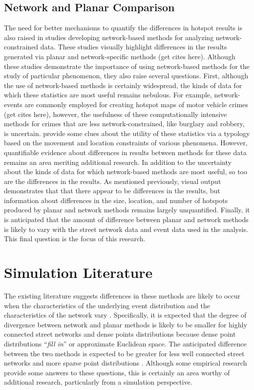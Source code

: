 \documentclass[12pt, letterpaper]{article}
\begin{document}
\subsection{Network and Planar Comparison}
The need for better mechanisms to quantify the differences in hotspot results is also raised in studies developing network-based methods for analyzing network-constrained data. These studies visually highlight differences in the results generated via planar and network-specific methods (get cites here). Although these studies demonstrate the importance of using network-based methods for the study of particular phenomenon, they also raise several questions. First, although the use of network-based methods is certainly widespread, the kinds of data for which these statistics are most useful remains nebulous. For example, network-events are commonly employed for creating hotspot maps of motor vehicle crimes (get cites here), however, the usefulness of these computationally intensive methods for crimes that are less network-constrained, like burglary and robbery, is uncertain. \citet{yamada2007local} provide some clues about the utility of these statistics via a typology based on the movement and location constraints of various phenomena. However, quantifiable evidence about differences in results between methods for these data remains an area meriting additional research. In addition to the uncertainty about the kinds of data for which network-based methods are most useful, so too are the differences in the results. As mentioned previously, visual output demonstrates that that there appear to be differences in the results, but information about differences in the size, location, and number of hotspots produced by planar and network methods remains largely unquantified. Finally, it is anticipated that the amount of difference between planar and network methods is likely to vary with the street network data and event data used in the analysis. This final question is the focus of this research.

\section{Simulation Literature}
The existing literature suggests differences in these methods are likely to occur when the characteristics of the underlying event distribution and the characteristics of the network vary \citep{yamada2004comparison}. Specifically, it is expected that the degree of divergence between network and planar methods is likely to be smaller for highly connected street networks and dense points distributions \citep{luchen2007false}because dense point distributions ``\emph{fill in}'' or approximate Euclidean space. The anticipated difference between the two methods is expected to be greater for less well connected street networks and more sparse point distributions  \citep{luchen2007false}. Although some empirical research provide some answers to these questions, this is certainly an area worthy of additional research, particularly from a simulation perspective.
\end{document}
